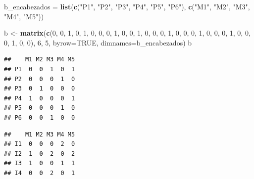 \documentclass[]{article}
\newenvironment{Shaded}{\begin{snugshade}}{\end{snugshade}}
\newcommand{\DataTypeTok}[1]{\textcolor[rgb]{0.13,0.29,0.53}{#1}}
\newcommand{\DecValTok}[1]{\textcolor[rgb]{0.00,0.00,0.81}{#1}}
\newcommand{\KeywordTok}[1]{\textcolor[rgb]{0.13,0.29,0.53}{\textbf{#1}}}
\newcommand{\NormalTok}[1]{#1}
\newcommand{\OperatorTok}[1]{\textcolor[rgb]{0.81,0.36,0.00}{\textbf{#1}}}
\newcommand{\OtherTok}[1]{\textcolor[rgb]{0.56,0.35,0.01}{#1}}
\newcommand{\StringTok}[1]{\textcolor[rgb]{0.31,0.60,0.02}{#1}}
\begin{document}
\begin{Shaded}
\begin{Highlighting}[]
\NormalTok{b_encabezados =}\StringTok{ }\KeywordTok{list}\NormalTok{(}\KeywordTok{c}\NormalTok{(}\StringTok{"P1"}\NormalTok{, }\StringTok{"P2"}\NormalTok{, }\StringTok{"P3"}\NormalTok{, }\StringTok{"P4"}\NormalTok{, }\StringTok{"P5"}\NormalTok{, }\StringTok{"P6"}\NormalTok{), }\KeywordTok{c}\NormalTok{(}\StringTok{"M1"}\NormalTok{, }\StringTok{"M2"}\NormalTok{, }\StringTok{"M3"}\NormalTok{, }\StringTok{"M4"}\NormalTok{, }\StringTok{"M5"}\NormalTok{))}

\NormalTok{b <-}\StringTok{ }\KeywordTok{matrix}\NormalTok{(}\KeywordTok{c}\NormalTok{(}\DecValTok{0}\NormalTok{, }\DecValTok{0}\NormalTok{, }\DecValTok{1}\NormalTok{, }\DecValTok{0}\NormalTok{, }\DecValTok{1}\NormalTok{,}
              \DecValTok{0}\NormalTok{, }\DecValTok{0}\NormalTok{, }\DecValTok{0}\NormalTok{, }\DecValTok{1}\NormalTok{, }\DecValTok{0}\NormalTok{,}
              \DecValTok{0}\NormalTok{, }\DecValTok{1}\NormalTok{, }\DecValTok{0}\NormalTok{, }\DecValTok{0}\NormalTok{, }\DecValTok{0}\NormalTok{,}
              \DecValTok{1}\NormalTok{, }\DecValTok{0}\NormalTok{, }\DecValTok{0}\NormalTok{, }\DecValTok{0}\NormalTok{, }\DecValTok{1}\NormalTok{,}
              \DecValTok{0}\NormalTok{, }\DecValTok{0}\NormalTok{, }\DecValTok{0}\NormalTok{, }\DecValTok{1}\NormalTok{, }\DecValTok{0}\NormalTok{,}
              \DecValTok{0}\NormalTok{, }\DecValTok{0}\NormalTok{, }\DecValTok{1}\NormalTok{, }\DecValTok{0}\NormalTok{, }\DecValTok{0}\NormalTok{),}
              \DecValTok{6}\NormalTok{, }\DecValTok{5}\NormalTok{, }\DataTypeTok{byrow=}\OtherTok{TRUE}\NormalTok{, }\DataTypeTok{dimnames=}\NormalTok{b_encabezados)}
\NormalTok{b}
\end{Highlighting}
\end{Shaded}

\begin{verbatim}
##    M1 M2 M3 M4 M5
## P1  0  0  1  0  1
## P2  0  0  0  1  0
## P3  0  1  0  0  0
## P4  1  0  0  0  1
## P5  0  0  0  1  0
## P6  0  0  1  0  0
\end{verbatim}

\begin{Shaded}
\end{Shaded}

\begin{verbatim}
##    M1 M2 M3 M4 M5
## I1  0  0  0  2  0
## I2  1  0  2  0  2
## I3  1  0  0  1  1
## I4  0  0  2  0  1
\end{verbatim}
\end{document}
